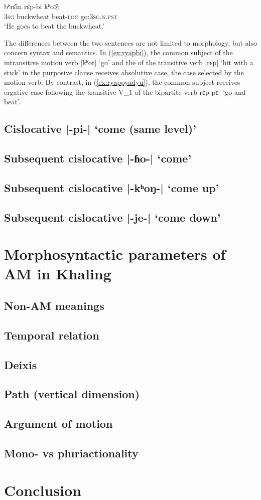 \documentclass[oneside,a4paper,11pt]{article}
\newcommand{\ipa}[1]{{\phon#1}}
\newcommand{\dhatu}[2]{|\ipa{#1}| `#2'}
\begin{document}
\begin{exe}
\ex \label{ex:ryapbi}
 \gll   \ipa{ʔʌ̄m} \ipa{bʰrɛ̂m} \ipa{rɛp-bi} \ipa{kʰoɔ̂j}   \\
 \textsc{3sg} buckwheat beat-\textsc{loc} go:\textsc{3sg.n.pst} \\
 \glt `He goes to beat the buckwheat.'
    \end{exe}  
   
The differences between the two sentences are not limited to morphology, but also concern syntax and semantics. In  (\ref{ex:ryapbi}), the common subject of the intransitive motion verb \dhatu{kʰot}{go} and the of the transitive verb \dhatu{rɛp}{hit with a stick} in the purposive clause receives absolutive case, the case selected by the motion verb. By contrast, in (\ref{ex:ryappyadyu}), the common subject receives ergative case following the transitive V_1 of the bipartite verb \ipa{rɛp-pɛ-} `go and beat'.
   
   
\subsection{Cislocative \dhatu{-pi-}{come (same level)}} \label{sec:v2.pi}
\subsection{Subsequent cislocative \dhatu{-ɦo-}{come}} \label{sec:v2.ho}
\subsection{Subsequent cislocative \dhatu{-kʰoŋ-}{come up}} \label{sec:v2.khoN}
\subsection{Subsequent cislocative \dhatu{-je-}{come down}} \label{sec:v2.je}

\section{Morphosyntactic parameters of AM in Khaling}
\subsection{Non-AM meanings}
\subsection{Temporal relation}
\subsection{Deixis}
\subsection{Path (vertical dimension)}
\subsection{Argument of motion}
\subsection{Mono- vs pluriactionality}

\section{Conclusion}



\end{document}
